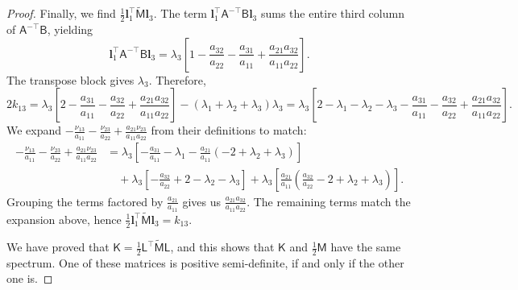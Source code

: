 \documentclass[10pt,a4paper]{amsart}
\newcommand{\bfl}{\boldsymbol{l}}
\newcommand{\msfA}{\mathsf{A}}
\newcommand{\msfB}{\mathsf{B}}
\newcommand{\msfK}{\mathsf{K}}
\newcommand{\msfL}{\mathsf{L}}
\newcommand{\msfM}{\mathsf{M}}
\begin{document}
\begin{proof}
  Finally, we find $\frac{1}{2} \bfl_1^\top \tilde{\msfM} \bfl_3$. The term $\bfl_1^\top \msfA^{-\top} \msfB \bfl_3$ sums the entire third column of $\msfA^{-\top} \msfB$, yielding 
  \[
    \bfl_1^\top \msfA^{-\top} \msfB \bfl_3 = \lambda_3 \left[ 1 - \frac{a_{32}}{a_{22}} - \frac{a_{31}}{a_{11}} + \frac{a_{21}a_{32}}{a_{11}a_{22}} \right].
  \]
  The transpose block gives $\lambda_3$. Therefore,
  \[
    2 k_{13} = \lambda_3 \left[ 2 - \frac{a_{31}}{a_{11}} - \frac{a_{32}}{a_{22}} + \frac{a_{21}a_{32}}{a_{11}a_{22}} \right] - (\lambda_1+\lambda_2+\lambda_3)\lambda_3 
    = \lambda_3 \left[ 2 - \lambda_1 - \lambda_2 - \lambda_3 - \frac{a_{31}}{a_{11}} - \frac{a_{32}}{a_{22}} + \frac{a_{21}a_{32}}{a_{11}a_{22}} \right].
  \]
  We expand $-\frac{\nu_{13}}{a_{11}} - \frac{\nu_{23}}{a_{22}} + \frac{a_{21}\nu_{23}}{a_{11}a_{22}}$ from their definitions to match:
  \begin{align*}
    -\frac{\nu_{13}}{a_{11}} - \frac{\nu_{23}}{a_{22}} + \frac{a_{21}\nu_{23}}{a_{11}a_{22}} &= \lambda_3 \left[ -\frac{a_{31}}{a_{11}} - \lambda_1 - \frac{a_{21}}{a_{11}}(-2+\lambda_2+\lambda_3) \right] \\
    &\quad + \lambda_3 \left[ -\frac{a_{32}}{a_{22}} + 2 - \lambda_2 - \lambda_3 \right] + \lambda_3 \left[ \frac{a_{21}}{a_{11}}\left( \frac{a_{32}}{a_{22}} - 2 + \lambda_2 + \lambda_3 \right) \right].
  \end{align*}
  Grouping the terms factored by $\frac{a_{21}}{a_{11}}$ gives us $\frac{a_{21}a_{32}}{a_{11}a_{22}}$. The remaining terms match the expansion above, hence $\frac{1}{2} \bfl_1^\top \tilde{\msfM} \bfl_3 = k_{13}$.
  
  We have proved that $\msfK = \frac{1}{2} \msfL^\top \tilde{\msfM} \msfL$, and this shows that $\msfK$ and $\frac12\msfM$ have the same spectrum. One of these matrices is positive semi-definite, if and only if the other one is.
\end{proof}
\end{document}
